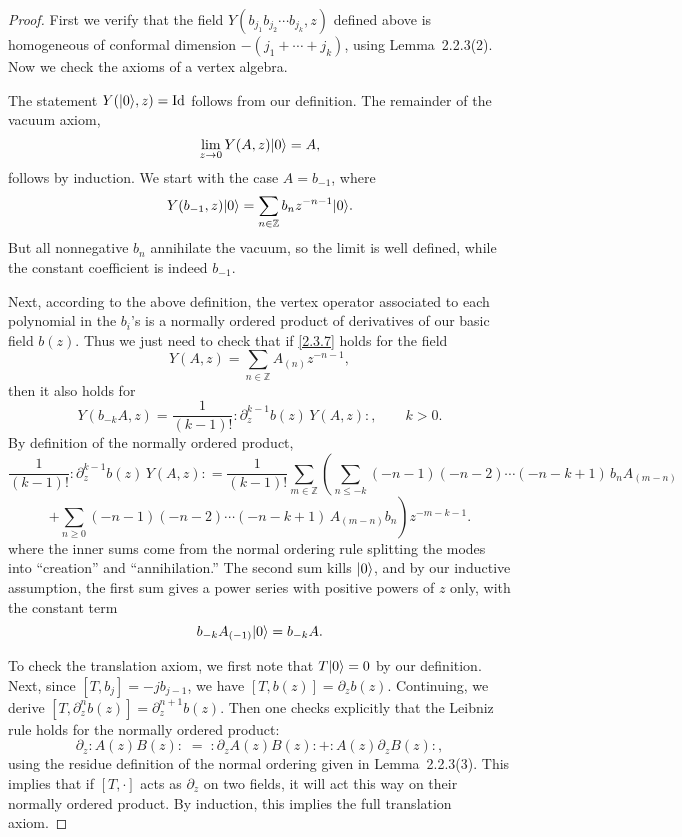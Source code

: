 \documentclass[12pt]{article}
\begin{document}
\begin{proof}
First we verify that the field $Y(b_{j_1}b_{j_2}\cdots b_{j_k},z)$ defined above
is homogeneous of conformal dimension $-(j_1+\cdots+j_k)$,
using Lemma~2.2.3(2).
Now we check the axioms of a vertex algebra.

The statement $Y(\lvert 0 \rangle,z)=\mathrm{Id}$ follows from our definition.
The remainder of the vacuum axiom,
\begin{equation}\label{2.3.7}
\lim_{z\to 0} Y(A,z)\lvert 0 \rangle = A,
\end{equation}
follows by induction. We start with the case $A=b_{-1}$, where
\[
Y(b_{-1},z)\lvert 0 \rangle = \sum_{n\in\mathbb{Z}} b_n z^{-n-1}\lvert 0 \rangle.
\]
But all nonnegative $b_n$ annihilate the vacuum,
so the limit is well defined, while the constant coefficient is indeed $b_{-1}$.

Next, according to the above definition, the vertex operator associated to each
polynomial in the $b_i$’s is a normally ordered product of derivatives
of our basic field $b(z)$. Thus we just need to check that if \eqref{2.3.7}
holds for the field
\[
Y(A,z)=\sum_{n\in\mathbb{Z}} A_{(n)}z^{-n-1},
\]
then it also holds for
\[
Y(b_{-k}A,z)
= \frac{1}{(k-1)!}:\partial_z^{k-1}b(z)\,Y(A,z):,\qquad k>0.
\]
By definition of the normally ordered product,
\[
\frac{1}{(k-1)!}:\partial_z^{k-1}b(z)\,Y(A,z):
= \frac{1}{(k-1)!}\sum_{m\in\mathbb{Z}}\!\!
\left(
\sum_{n\le -k} (-n-1)(-n-2)\cdots(-n-k+1)\,b_nA_{(m-n)}\right.
\]
\[
\left.
+\sum_{n\ge 0} (-n-1)(-n-2)\cdots(-n-k+1)\,A_{(m-n)}b_n
\right)z^{-m-k-1}.
\]
where the inner sums come from the normal ordering rule splitting the modes into “creation” and “annihilation.”
The second sum kills $\lvert 0 \rangle$, and by our inductive assumption,
the first sum gives a power series with positive powers of $z$ only,
with the constant term
\[
b_{-k}A_{(-1)}\lvert 0 \rangle = b_{-k}A.
\]

To check the translation axiom, we first note that $T\lvert 0 \rangle=0$ by our definition.
Next, since $[T,b_j] = -j b_{j-1}$, we have $[T,b(z)] = \partial_z b(z)$.
Continuing, we derive $[T,\partial_z^n b(z)] = \partial_z^{n+1} b(z)$.
Then one checks explicitly that the Leibniz rule holds for the normally ordered product:
\[
\partial_z :A(z)B(z): \;=\; :\partial_z A(z)B(z): + :A(z)\partial_z B(z):,
\]
using the residue definition of the normal ordering given in Lemma~2.2.3(3).
This implies that if $[T,\cdot]$ acts as $\partial_z$ on two fields,
it will act this way on their normally ordered product.
By induction, this implies the full translation axiom.


\end{proof}
\end{document}
